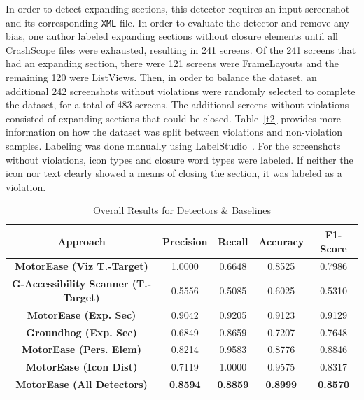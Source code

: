  In order to detect expanding sections, this detector requires an input screenshot and its corresponding \texttt{\small XML} file. In order to evaluate the detector and remove any bias, one author labeled expanding sections without closure elements until all CrashScope files were exhausted, resulting in 241 screens. Of the 241 screens that had an expanding section, there were 121 screens were FrameLayouts and the remaining 120 were ListViews. Then, in order to balance the dataset, an additional 242 screenshots without violations were randomly selected to complete the dataset, for a total of 483 screens. The additional screens without violations consisted of expanding sections that could be closed. Table~\ref{t2} provides more information on how the dataset was split between violations and non-violation samples. Labeling was done manually using LabelStudio~\cite{LabelStudio}. For the screenshots without violations, icon types and closure word types were labeled. If neither the icon nor text clearly showed a means of closing the section, it was labeled as a violation. 

\begin{table}[t]
    \caption{Overall Results for \MotorEase Detectors \& Baselines}

    \centering
    \begin{tabular}{ c|c|c|c|c } 
         \textbf{Approach} & \textbf{Precision} & \textbf{Recall} & \textbf{Accuracy} & \textbf{F1-Score}\\\hline
        \textbf{{\sc\textbf{MotorEase}} (Viz T.-Target)} & 1.0000 & 0.6648 & 0.8525 & 0.7986\\ 
		\textbf{G-Accessibility Scanner (T.-Target)} & 0.5556 & 0.5085 & 0.6025 & 0.5310 \\\hline 
        \textbf{{\sc\textbf{MotorEase}} (Exp. Sec)} & 0.9042 & 0.9205 & 0.9123 & 0.9129\\ 
		\textbf{Groundhog (Exp. Sec)} & 0.6849 & 0.8659 & 0.7207 & 0.7648 \\ \hline
        \textbf{{\sc\textbf{MotorEase}} (Pers. Elem)} & 0.8214 & 0.9583 & 0.8776 & 0.8846\\
        \textbf{{\sc\textbf{MotorEase}} (Icon Dist)} & 0.7119 & 1.0000 & 0.9575 & 0.8317\\\hline
        \textbf{{\sc\textbf{MotorEase}} (All Detectors)} & \textbf{0.8594} & \textbf{0.8859} & \textbf{0.8999} & \textbf{0.8570}\\
       
    \end{tabular}
    \label{results}
\end{table}

